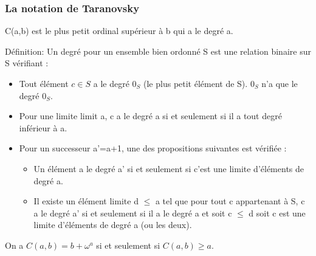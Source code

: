 \documentclass[12pt]{beamer}
\begin{document}
\begin{frame}
\frametitle{La notation de Taranovsky}

\small

C(a,b) est le plus petit ordinal supérieur à b qui a le degré a.

Définition: Un degré pour un ensemble bien ordonné S est une relation binaire sur S vérifiant :

\footnotesize

\begin{itemize}
	\item Tout élément \( c \in S \) a le degré \( 0_S \) (le plus petit élément de S). \( 0_S \) n'a que le degré  \( 0_S \).
	\item Pour une limite limit a, c a le degré a si et seulement si il a tout degré inférieur à a.
	\item Pour un successeur a'=a+1, une des propositions suivantes est vérifiée :
	\begin{itemize}
		\item Un élément a le degré a' si et seulement si c'est une limite d'éléments de degré a.
		\item Il existe un élément limite d \(\le\) a tel que pour tout c appartenant à S, c a le degré a' si et seulement si il a le degré a et soit c \(\le\) d soit c est une limite d'éléments de degré a (ou les deux). 
	\end{itemize}
\end{itemize}

\small

On a \( C(a,b) = b+\omega^a \) si et seulement si \( C(a,b) \ge a \).

\end{frame}
\end{document}
